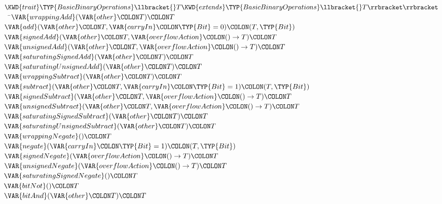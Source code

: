 \begin{Fortress}
\(\KWD{trait} \TYP{BasicBinaryOperations}\llbracket{}T \KWD{extends} \TYP{BasicBinaryOperations}\llbracket{}T\rrbracket\rrbracket\)\\
{\tt~~}\pushtabs\=\+\(  \VAR{wrappingAdd}(\VAR{other}\COLON T)\COLON T\)\\
\(  \VAR{add}(\VAR{other}\COLON T, \VAR{carryIn}\COLON \TYP{Bit}=0)\COLON (T,\TYP{Bit})\)\\
\(  \VAR{signedAdd}(\VAR{other}\COLON T, \VAR{overflowAction}\COLON ()\rightarrow{}T)\COLON T\)\\
\(  \VAR{unsignedAdd}(\VAR{other}\COLON T, \VAR{overflowAction}\COLON ()\rightarrow{}T)\COLON T\)\\
\(  \VAR{saturatingSignedAdd}(\VAR{other}\COLON T)\COLON T\)\\
\(  \VAR{saturatingUnsignedAdd}(\VAR{other}\COLON T)\COLON T\)\\
\(  \VAR{wrappingSubtract}(\VAR{other}\COLON T)\COLON T\)\\
\(  \VAR{subtract}(\VAR{other}\COLON T, \VAR{carryIn}\COLON \TYP{Bit}=1)\COLON (T,\TYP{Bit})\)\\
\(  \VAR{signedSubtract}(\VAR{other}\COLON T, \VAR{overflowAction}\COLON ()\rightarrow{}T)\COLON T\)\\
\(  \VAR{unsignedSubtract}(\VAR{other}\COLON T, \VAR{overflowAction}\COLON ()\rightarrow{}T)\COLON T\)\\
\(  \VAR{saturatingSignedSubtract}(\VAR{other}\COLON T)\COLON T\)\\
\(  \VAR{saturatingUnsignedSubtract}(\VAR{other}\COLON T)\COLON T\)\\
\(  \VAR{wrappingNegate}()\COLON T\)\\
\(  \VAR{negate}(\VAR{carryIn}\COLON \TYP{Bit}=1)\COLON (T,\TYP{Bit})\)\\
\(  \VAR{signedNegate}(\VAR{overflowAction}\COLON ()\rightarrow{}T)\COLON T\)\\
\(  \VAR{unsignedNegate}(\VAR{overflowAction}\COLON ()\rightarrow{}T)\COLON T\)\\
\(  \VAR{saturatingSignedNegate}()\COLON T\)\\
\(  \VAR{bitNot}()\COLON T\)\\
\(  \VAR{bitAnd}(\VAR{other}\COLON T)\COLON T\)\\

\end{Fortress}
